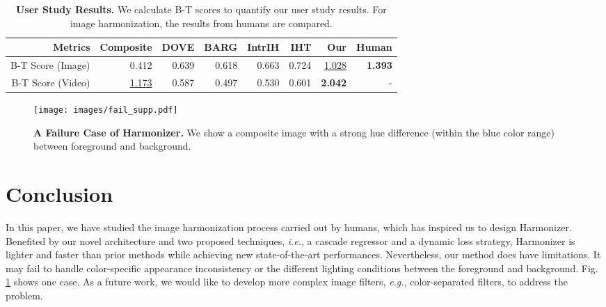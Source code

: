 \documentclass[runningheads]{llncs}
\newcommand{\ke}[1]{{\color{black}#1}}
\begin{document}
\begin{table*}[t]
  \begin{center}
    \caption{\textbf{User Study Results.} We calculate B-T scores to quantify our user study results. For image harmonization, the results from humans are compared.}\label{tab:b-t}
\setlength{\tabcolsep}{4pt}
\scriptsize
\begin{tabular}{r|rrrrr|rr}
\toprule 
      Metrics & Composite & DOVE\cite{DoveNet} & BARG\cite{BargainNet} & IntrIH\cite{IntrinsicIH} & IHT\cite{TransformerIH} & Our & Human \\
      \midrule
      B-T Score (Image)  & 0.412 & 0.639 & 0.618 & 0.663 & 0.724 & \uline{1.028} & \textbf{1.393} \\
      B-T Score (Video)  & \uline{1.173} & 0.587 & 0.497 & 0.530 & 0.601 & \textbf{2.042} & - \\
      \bottomrule
    \end{tabular}
\vspace{-0.5cm}
\end{center}
\end{table*}

 \begin{figure}[ht]
\centering
\vspace{-0.5cm}
\texttt{[image: images/fail\_supp.pdf]}
{\begin{center}
\vspace{-0.5cm}
\caption{\textbf{A Failure Case of Harmonizer.} We show a composite image with a strong hue difference (within the blue color range) between foreground and background.}
\label{fig:fail_visual}
\end{center}
}
\vspace{-1.5cm}
\end{figure}


\section{Conclusion}

In this paper, we have studied the image harmonization process carried out by humans, which has inspired us to design Harmonizer. Benefited by our novel architecture and two proposed techniques, {\it i.e.}, a cascade regressor and a dynamic loss strategy, Harmonizer is lighter and faster than prior methods while achieving new state-of-the-art performances. Nevertheless, our method does have limitations. \ke{It may fail to handle color-specific appearance inconsistency or the different lighting conditions between the foreground and background. Fig.\,\ref{fig:fail_visual} shows one case.} As a future work, we would like to develop more complex image filters, {\it e.g.}, color-separated filters, to address the problem.
\end{document}
